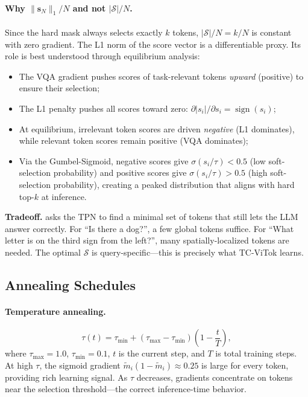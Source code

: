 \documentclass[11pt,a4paper]{article}
\newcommand{\vs}{\mathbf{s}}
\begin{document}
\paragraph{Why $\|\vs_N\|_1/N$ and not $|\mathcal{S}|/N$.}
Since the hard mask always selects exactly $k$ tokens, $|\mathcal{S}|/N=k/N$ is
constant with zero gradient. The L1 norm of the score vector is a differentiable
proxy. Its role is best understood through equilibrium analysis:
\begin{itemize}[leftmargin=1.5em, itemsep=2pt]
  \item The VQA gradient pushes scores of task-relevant tokens \emph{upward}
    (positive) to ensure their selection;
  \item The L1 penalty pushes all scores toward zero:
    $\partial|s_i|/\partial s_i=\operatorname{sign}(s_i)$;
  \item At equilibrium, irrelevant token scores are driven \emph{negative}
    (L1 dominates), while relevant token scores remain positive (VQA dominates);
  \item Via the Gumbel-Sigmoid, negative scores give $\sigma(s_i/\tau)<0.5$
    (low soft-selection probability) and positive scores give
    $\sigma(s_i/\tau)>0.5$ (high soft-selection probability), creating a peaked
    distribution that aligns with hard top-$k$ at inference.
\end{itemize}

\begin{intuitionbox}
  \textbf{Tradeoff.}  asks the TPN to find a minimal set of
  tokens that still lets the LLM answer correctly. For ``Is there a dog?'', a few
  global tokens suffice. For ``What letter is on the third sign from the left?'',
  many spatially-localized tokens are needed. The optimal $\mathcal{S}$ is
  query-specific---this is precisely what TC-ViTok learns.
\end{intuitionbox}

\subsection{Annealing Schedules}
\label{subsec:annealing}

\paragraph{Temperature annealing.}
\begin{equation}
  \tau(t) = \tau_{\min}
    + (\tau_{\max}-\tau_{\min})\!\left(1-\frac{t}{T}\right),
  \label{eq:tau_anneal}
\end{equation}
where $\tau_{\max}{=}1.0$, $\tau_{\min}{=}0.1$, $t$ is the current step, and $T$
is total training steps. At high $\tau$, the sigmoid gradient
$\tilde{m}_i(1-\tilde{m}_i)\approx0.25$ is large for every token, providing
rich learning signal. As $\tau$ decreases, gradients concentrate on tokens near
the selection threshold---the correct inference-time behavior.
\end{document}

